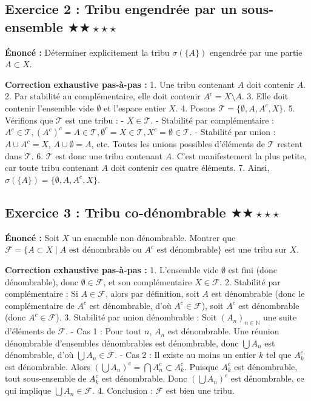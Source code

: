 \documentclass[11pt,a4paper]{article}
\begin{document}
\subsection*{Exercice 2 : Tribu engendrée par un sous-ensemble \quad $\bigstar\bigstar\star\star\star$}


\textbf{Énoncé :}
Déterminer explicitement la tribu $\sigma(\{A\})$ engendrée par une partie $A \subset X$.

\textbf{Correction exhaustive pas-à-pas :}
1. Une tribu contenant $A$ doit contenir $A$.
2. Par stabilité au complémentaire, elle doit contenir $A^c = X \setminus A$.
3. Elle doit contenir l'ensemble vide $\emptyset$ et l'espace entier $X$.
4. Posons $\mathcal{T} = \{\emptyset, A, A^c, X\}$.
5. Vérifions que $\mathcal{T}$ est une tribu :
   - $X \in \mathcal{T}$.
   - Stabilité par complémentaire : $A^c \in \mathcal{T}, (A^c)^c = A \in \mathcal{T}, \emptyset^c = X \in \mathcal{T}, X^c = \emptyset \in \mathcal{T}$.
   - Stabilité par union : $A \cup A^c = X$, $A \cup \emptyset = A$, etc. Toutes les unions possibles d'éléments de $\mathcal{T}$ restent dans $\mathcal{T}$.
6. $\mathcal{T}$ est donc une tribu contenant $A$. C'est manifestement la plus petite, car toute tribu contenant $A$ doit contenir ces quatre éléments.
7. Ainsi, $\sigma(\{A\}) = \{\emptyset, A, A^c, X\}$.



\subsection*{Exercice 3 : Tribu co-dénombrable \quad $\bigstar\bigstar\star\star\star$}


\textbf{Énoncé :}
Soit $X$ un ensemble non dénombrable. Montrer que $\mathcal{F} = \{A \subset X \mid A \text{ est dénombrable ou } A^c \text{ est dénombrable}\}$ est une tribu sur $X$.

\textbf{Correction exhaustive pas-à-pas :}
1. L'ensemble vide $\emptyset$ est fini (donc dénombrable), donc $\emptyset \in \mathcal{F}$, et son complémentaire $X \in \mathcal{F}$.
2. Stabilité par complémentaire : Si $A \in \mathcal{F}$, alors par définition, soit $A$ est dénombrable (donc le complémentaire de $A^c$ est dénombrable, d'où $A^c \in \mathcal{F}$), soit $A^c$ est dénombrable (donc $A^c \in \mathcal{F}$).
3. Stabilité par union dénombrable : Soit $(A_n)_{n \in \mathbb{N}}$ une suite d'éléments de $\mathcal{F}$.
   - Cas 1 : Pour tout $n$, $A_n$ est dénombrable. Une réunion dénombrable d'ensembles dénombrables est dénombrable, donc $\bigcup A_n$ est dénombrable, d'où $\bigcup A_n \in \mathcal{F}$.
   - Cas 2 : Il existe au moins un entier $k$ tel que $A_k^c$ est dénombrable.
     Alors $(\bigcup A_n)^c = \bigcap A_n^c \subset A_k^c$.
     Puisque $A_k^c$ est dénombrable, tout sous-ensemble de $A_k^c$ est dénombrable.
     Donc $(\bigcup A_n)^c$ est dénombrable, ce qui implique $\bigcup A_n \in \mathcal{F}$.
4. Conclusion : $\mathcal{F}$ est bien une tribu.
\end{document}
